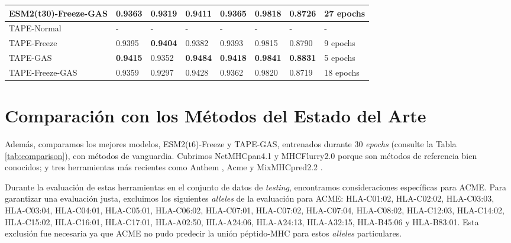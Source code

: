 \begin{table}[]
{\begin{tabular}{llllllll}
		ESM2(t30)-Freeze-GAS & 0.9363            & 0.9319             & 0.9411          & 0.9365            & \textbf{0.9818} & 0.8726          & 27 epochs           \\ \midrule
		TAPE-Normal                 & -                 & -                  & -               & -                 & -               & -               & -                   \\
		TAPE-Freeze          & 0.9395            & \textbf{0.9404}    & 0.9382          & 0.9393            & 0.9815          & 0.8790          & 9 epochs            \\
		TAPE-GAS             & \textbf{0.9415}   & 0.9352             & \textbf{0.9484} & \textbf{0.9418}   & \textbf{0.9841} & \textbf{0.8831} & 5 epochs            \\
		TAPE-Freeze-GAS      & 0.9359            & 0.9297             & 0.9428          & 0.9362            & 0.9820          & 0.8719          & 18 epochs      \\     
	\end{tabular}}
\end{table}

\section{Comparación con los Métodos del Estado del Arte}

\sloppy
Además, comparamos los mejores modelos, ESM2(t6)-Freeze y TAPE-GAS, entrenados durante 30 \textit{epochs} (consulte la Tabla \ref{tab:comparison}), con métodos de vanguardia. Cubrimos NetMHCpan4.1 \citep{reynisson2020netmhcpan} y MHCFlurry2.0 \citep{o2020mhcflurry} porque son métodos de referencia bien conocidos; y tres herramientas más recientes como Anthem \citep{mei2021anthem}, Acme \citep{hu2019acme} y MixMHCpred2.2 \citep{gfeller2023improved}.

\sloppy
Durante la evaluación de estas herramientas en el conjunto de datos de \textit{testing}, encontramos consideraciones específicas para ACME. Para garantizar una evaluación justa, excluimos los siguientes \textit{alleles} de la evaluación para ACME: HLA-C01:02, HLA-C02:02, HLA-C03:03, HLA-C03:04, HLA-C04:01, HLA-C05:01, HLA-C06:02, HLA-C07:01, HLA-C07:02, HLA-C07:04, HLA-C08:02, HLA-C12:03, HLA-C14:02, HLA-C15:02, HLA-C16:01, HLA-C17:01, HLA-A02:50, HLA-A24:06, HLA-A24:13, HLA-A32:15, HLA-B45:06 y HLA-B83:01. Esta exclusión fue necesaria ya que ACME no pudo predecir la unión péptido-MHC para estos \textit{alleles} particulares. 


